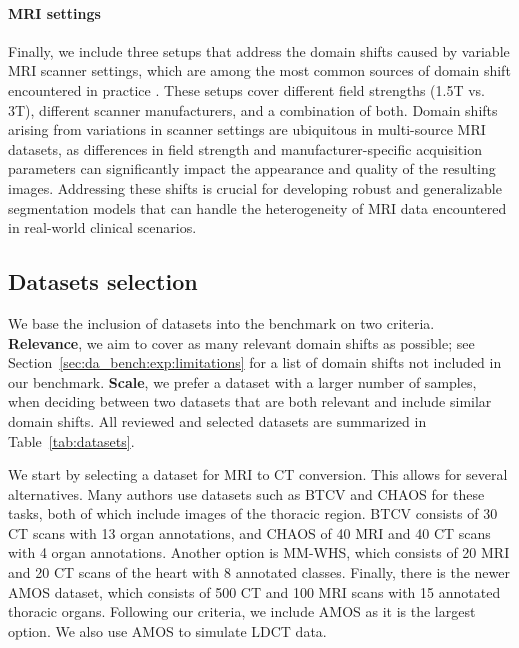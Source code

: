 \paragraph{MRI settings}

Finally, we include three setups that address the domain shifts caused by variable MRI scanner settings, which are among the most common sources of domain shift encountered in practice \cite{yan2020mri,medim_da_survey_2023}. These setups cover different field strengths (1.5T vs. 3T), different scanner manufacturers, and a combination of both. Domain shifts arising from variations in scanner settings are ubiquitous in multi-source MRI datasets, as differences in field strength and manufacturer-specific acquisition parameters can significantly impact the appearance and quality of the resulting images. Addressing these shifts is crucial for developing robust and generalizable segmentation models that can handle the heterogeneity of MRI data encountered in real-world clinical scenarios.



\subsection{Datasets selection}

We base the inclusion of datasets into the benchmark on two criteria. \textbf{Relevance}, we aim to cover as many relevant domain shifts as possible; see Section~\ref{sec:da_bench:exp:limitations} for a list of domain shifts not included in our benchmark. \textbf{Scale}, we prefer a dataset with a larger number of samples, when deciding between two datasets that are both relevant and include similar domain shifts. All reviewed and selected datasets are summarized in Table~\ref{tab:datasets}.%



We start by selecting a dataset for MRI to CT conversion. This allows for several alternatives. Many authors use datasets such as BTCV and CHAOS for these tasks, both of which include images of the thoracic region. BTCV consists of 30 CT scans with 13 organ annotations, and CHAOS of 40 MRI and 40 CT scans with 4 organ annotations. Another option is MM-WHS, which consists of 20 MRI and 20 CT scans of the heart with 8 annotated classes. Finally, there is the newer AMOS dataset, which consists of 500 CT and 100 MRI scans with 15 annotated thoracic organs. Following our criteria, we include AMOS as it is the largest option. We also use AMOS to simulate LDCT data.

